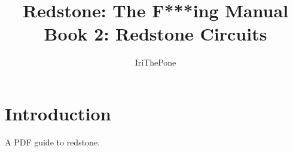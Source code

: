 \documentclass[12pt]{article}
\title{Redstone: The F***ing Manual\\{\Large Book 2: Redstone Circuits}}
\author{IriThePone}
\begin{document}
\maketitle
\pagebreak
\tableofcontents
\pagebreak

\section{Introduction}
A PDF guide to redstone.
\pagebreak
\end{document}
